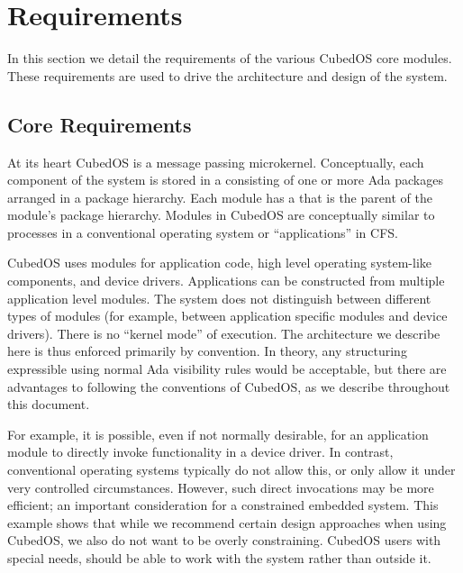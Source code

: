 
\section{Requirements}
\label{sec:development-requirements}

In this section we detail the requirements of the various CubedOS core modules. These
requirements are used to drive the architecture and design of the system. 

\subsection{Core Requirements}
\label{sec:requirements-core-requirements}

At its heart CubedOS is a message passing microkernel. Conceptually, each component of the
system is stored in a  consisting of one or more Ada packages arranged in a
package hierarchy. Each module has a  that is the parent of the
module's package hierarchy. Modules in CubedOS are conceptually similar to processes in a
conventional operating system or ``applications'' in CFS.

CubedOS uses modules for application code, high level operating system-like components, and
device drivers. Applications can be constructed from multiple application level modules. The
system does not distinguish between different types of modules (for example, between application
specific modules and device drivers). There is no ``kernel mode'' of execution. The architecture
we describe here is thus enforced primarily by convention. In theory, any structuring
expressible using normal Ada visibility rules would be acceptable, but there are advantages to
following the conventions of CubedOS, as we describe throughout this document. 

For example, it is possible, even if not normally desirable, for an application module to
directly invoke functionality in a device driver. In contrast, conventional operating systems
typically do not allow this, or only allow it under very controlled circumstances. However, such
direct invocations may be more efficient; an important consideration for a constrained embedded
system. This example shows that while we recommend certain design approaches when using CubedOS,
we also do not want to be overly constraining. CubedOS users with special needs, should be able
to work with the system rather than outside it.

